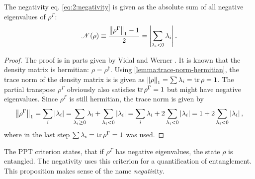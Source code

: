 \begin{proposition}\label{proposition:negativity}
  The negativity eq. \eqref{eq:2:negativity} is given as the absolute sum of all negative eigenvalues of $\rho^{\Gamma}$: 
\begin{equation}
    \mathscr{N}(\rho) \equiv \frac{\left\lVert\rho^{\Gamma}\right\rVert_1 - 1}{2} = \left\lvert\sum_{\lambda_i < 0} \lambda_i\right\rvert.
\end{equation}
\end{proposition}
\begin{proof}
  The proof is in parts given by Vidal and Werner \cite{Vidal_2001}. It is known that the density matrix is hermitian: $\rho = \rho^\dagger$. Using \cref{lemma:trace-norm-hermitian}, the trace norm of the density matrix is is given as $\left\lVert\rho\right\rVert_1=\sum \lambda_i = \tr \rho = 1$. The partial transpose $\rho^{\Gamma}$ obviously also satisfies $\tr \rho^{\Gamma} = 1$ but might have negative eigenvalues. Since $\rho^{\Gamma}$ is still hermitian, the trace norm is given by
  \begin{equation*}
    \left\lVert\rho^{\Gamma}\right\rVert_1 = \sum_i\left\lvert\lambda_i\right\rvert = \sum_{\lambda_i \ge 0} \lambda_i + \sum_{\lambda_i < 0} \left\lvert\lambda_i\right\rvert = \sum_i \lambda_i + 2\sum_{\lambda_i < 0} \left\lvert\lambda_i\right\rvert = 1 + 2\sum_{\lambda_i < 0} \left\lvert\lambda_i\right\rvert ,
  \end{equation*}
  where in the last step $\sum \lambda_i = \tr \rho^{\Gamma} = 1$ was used.
\end{proof}
\begin{remark}
  The PPT criterion states, that if $\rho^{\Gamma}$ has negative eigenvalues, the state $\rho$ is entangled. The negativity uses this criterion for a quantification of entanglement. This proposition makes sense of the name \textit{negativ}ity.
\end{remark}

